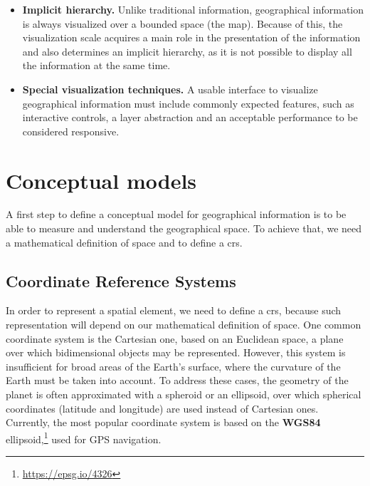 \begin{itemize}
        \item \textbf{Implicit hierarchy.} Unlike traditional information, geographical information is always visualized over a bounded space (the map). Because of this, the visualization scale acquires a main role in the presentation of the information and also determines an implicit hierarchy, as it is not possible to display all the information at the same time.
        
        \item \textbf{Special visualization techniques.} A usable interface to visualize geographical information must include commonly expected features, such as interactive controls, a layer abstraction and an acceptable performance to be considered responsive.
    \end{itemize}
    
    \section{Conceptual models}
    \label{gis:concept}
    A first step to define a conceptual model for geographical information is to be able to measure and understand the geographical space. To achieve that, we need a mathematical definition of space and to define a \gls{crs}.
    
    \subsection{Coordinate Reference Systems}
    In order to represent a spatial element, we need to define a \gls{crs}, because such representation will depend on our mathematical definition of space. One common coordinate system is the Cartesian one, based on an Euclidean space, a plane over which bidimensional objects may be represented. However, this system is insufficient for broad areas of the Earth's surface, where the curvature of the Earth must be taken into account. To address these cases, the geometry of the planet is often approximated with a spheroid or an ellipsoid, over which spherical coordinates (latitude and longitude) are used instead of Cartesian ones. Currently, the most popular coordinate system is based on the \textbf{WGS84} ellipsoid,\footnote{\url{https://epsg.io/4326}} used for GPS navigation.
    
